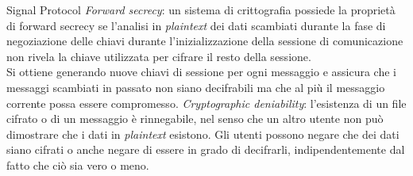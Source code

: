 \begin{frame}{Signal Protocol}
{        \textit{Forward secrecy}: un sistema di crittografia possiede la proprietà di forward secrecy se l'analisi in \textit{plaintext} dei dati scambiati durante la fase di negoziazione delle chiavi durante l'inizializzazione della sessione di comunicazione non rivela la chiave utilizzata per cifrare il resto della sessione.\\Si ottiene generando nuove chiavi di sessione per ogni messaggio e assicura che i messaggi scambiati in passato non siano decifrabili ma che al più il messaggio corrente possa essere compromesso.\newline
        \textit{Cryptographic deniability}: l'esistenza di un file cifrato o di un messaggio è rinnegabile, nel senso che un altro utente non può dimostrare che i dati in \textit{plaintext} esistono. Gli utenti possono negare che dei dati siano cifrati o anche negare di essere in grado di decifrarli, indipendentemente dal fatto che ciò sia vero o meno.
    }
\end{frame}


